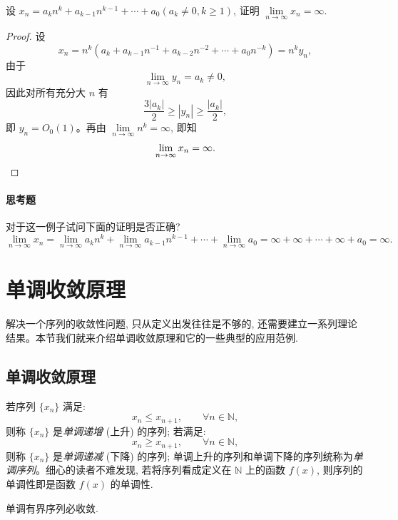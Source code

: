 \begin{example}\label{example:ma-2-2-6}
设 $x_n=a_kn^k+a_{k-1}n^{k-1}+\cdots+a_0(a_k\ne0,k\geqslant1)$, 证明 $\lim\limits_{n\to\infty}x_n=\infty$.
\end{example}


\begin{proof}
设
\[
  x_n=n^k(a_k+a_{k-1}n^{-1}+a_{k-2}n^{-2}+\cdots+a_0n^{-k})=n^ky_n,
\]
由于
\[
  \lim_{n\to\infty}y_n=a_k\ne0,
\]
因此对所有充分大 $n$ 有
\[
  \frac{3|a_k|}{2}\geqslant |y_n|\geqslant\frac{|a_k|}{2},
\]
即 $y_n=O_0(1)$。再由 $\lim\limits_{n\to\infty}n^k=\infty$, 即知
\[
  \lim_{n\to\infty}x_n=\infty.
\qedhere
\]
\end{proof}


\paragraph*{思考题}
对于这一例子试问下面的证明是否正确?
\[
  \lim_{n\to\infty}x_n
  =
  \lim_{n\to\infty}a_kn^k+\lim_{n\to\infty}a_{k-1}n^{k-1}+\cdots+\lim_{n\to\infty}a_0
  =
  \infty+\infty+\cdots+\infty+a_0=\infty.
\]

\section{单调收敛原理}
\label{sec:ma-2-3}

解决一个序列的收敛性问题, 只从定义出发往往是不够的, 还需要建立一系列理论结果。本节我们就来介绍单调收敛原理和它的一些典型的应用范例.

\subsection{单调收敛原理}
\label{subsec:ma-2-3-1}

若序列 $\{x_n\}$ 满足:
\[
  x_n\leqslant x_{n+1},\qquad \forall n\in\mathbb{N},
\]
则称 $\{x_n\}$ 是\emph{单调递增} (上升) 的序列; 若满足:
\[
  x_n\geqslant x_{n+1},\qquad \forall n\in\mathbb{N},
\]
则称 $\{x_n\}$ 是\emph{单调递减} (下降) 的序列; 单调上升的序列和单调下降的序列统称为\emph{单调序列}。细心的读者不难发现, 若将序列看成定义在 $\mathbb{N}$ 上的函数 $f(x)$, 则序列的单调性即是函数 $f(x)$ 的单调性.

\begin{theorem}[{单调收敛原理}]\label{theorem:ma-2-3-1}
单调有界序列必收敛.
\end{theorem}


